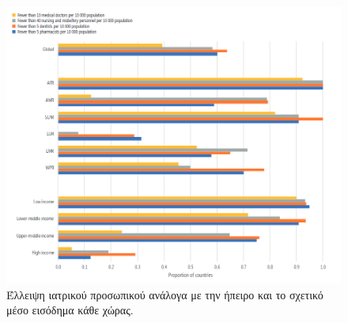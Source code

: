 \begin{figure}[h!]
\includegraphics[scale=0.6]{images/who_insufficient.png}
\centering
\caption{Έλλειψη ιατρικού προσωπικού ανάλογα με την ήπειρο και το σχετικό μέσο εισόδημα κάθε χώρας. \cite{WHO}}
\label{insufficient}
\end{figure}
\par

